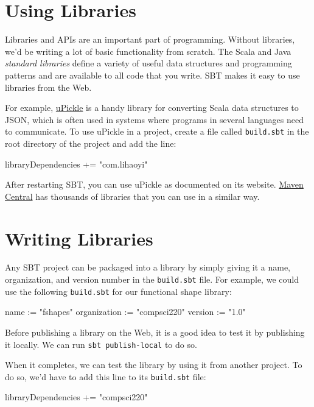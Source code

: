 \documentclass[9pt]{extbook}
\begin{document}
\section{Using Libraries}

Libraries and APIs are an important part of programming. Without libraries,
we'd be writing a lot of basic functionality from scratch. The Scala
and Java \emph{standard libraries} define a variety of useful data structures
and programming patterns and are available to all code that you write.
SBT makes it easy to use libraries from the Web.

For example,
\href{https://lihaoyi.github.io/upickle-pprint/upickle/}{uPickle} is a
handy library for converting Scala data structures to JSON, which is
often used in systems where programs in several languages need to communicate.
To use uPickle in a project, create a file called \texttt{build.sbt} in the
root directory of the project and add the line:
%
\begin{scalacode}
libraryDependencies += "com.lihaoyi" %
\end{scalacode}
%
After restarting SBT, you can use uPickle as documented on its website.
\href{http://mvnrepository.com}{Maven Central} has thousands of libraries
that you can use in a similar way.

\section{Writing Libraries}

Any SBT project can be packaged into a library by simply giving it
a name, organization, and version number in the \texttt{build.sbt} file.
For example, we could use the following \texttt{build.sbt} for our
functional shape library:

\begin{scalacode}
name := "fshapes"
organization := "compsci220"
version := "1.0"
\end{scalacode}

Before publishing a library on the Web, it is a good idea to test it by
publishing it locally. We can run \texttt{sbt publish-local} to do so.

When it completes, we can test the library by using it from another
project. To do so, we'd have to add this line to its \texttt{build.sbt}
file:
\begin{scalacode}
libraryDependencies += "compsci220" %
\end{scalacode}
\end{document}
